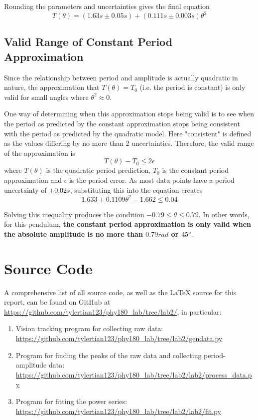 \documentclass[aps,twocolumn,secnumarabic,nobalancelastpage,amsmath,amssymb,nofootinbib,floatfix]{revtex4}
\begin{document}
Rounding the parameters and uncertainties gives the final equation
\begin{equation}
    T(\theta) = (1.63\si{s} \pm 0.05\si{s}) + (0.111\si{s} \pm 0.003\si{s})\theta^2
\end{equation}

\subsection{Valid Range of Constant Period Approximation}

Since the relationship between period and amplitude is actually quadratic in nature, the approximation that
$T(\theta) = T_0$ (i.e. the period is constant) is only valid for small angles where $\theta^2 \approx 0$.

One way of determining when this approximation stops being valid is to see when the period as predicted by the constant
approximation stops being consistent with the period as predicted by the quadratic model. Here "consistent" is defined
as the values differing by no more than 2 uncertainties. Therefore, the valid range of the approximation is
\begin{equation}
    T(\theta) - T_0 \leq 2\epsilon
\end{equation}
where $T(\theta)$ is the quadratic period prediction, $T_0$ is the constant period approximation and $\epsilon$ is the
period error. As most data points have a period uncertainty of $\pm 0.02\si{s}$, substituting this into the equation creates
\begin{equation}
    1.633 + 0.1109\theta^2 - 1.662 \leq 0.04
\end{equation}

Solving this inequality produces the condition $-0.79 \leq \theta \leq 0.79$. In other words, for this pendulum,
\textbf{the constant period approximation is only valid when the absolute amplitude is no more than $0.79\si{rad}$ or
$45\degree$}.


\appendix

\section{Source Code}

A comprehensive list of all source code, as well as the \LaTeX{} source for this report, can be found on GitHub at
\url{https://github.com/tylertian123/phy180_lab/tree/lab2/}, in particular:
\label{appendix:code}
\begin{enumerate}
    \item Vision tracking program for collecting raw data: \url{https://github.com/tylertian123/phy180_lab/tree/lab2/gendata.py}
    \item Program for finding the peaks of the raw data and collecting period-amplitude data: \url{https://github.com/tylertian123/phy180_lab/tree/lab2/lab2/process_data.py}
    \item Program for fitting the power series: \url{https://github.com/tylertian123/phy180_lab/tree/lab2/lab2/fit.py}
\end{enumerate}
\end{document}
